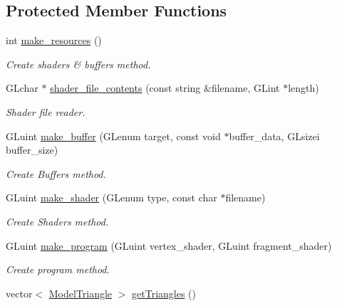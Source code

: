 \subsection*{Protected Member Functions}
\begin{DoxyCompactItemize}
\item 
int \hyperlink{classGameAsset_aa26d85233ece476d599adf90074e9568}{make\-\_\-resources} ()
\begin{DoxyCompactList}\small\item\em Create shaders \& buffers method. \end{DoxyCompactList}\item 
G\-Lchar $\ast$ \hyperlink{classGameAsset_a08c617aafc70dcba441f53260f1bb09f}{shader\-\_\-file\-\_\-contents} (const string \&filename, G\-Lint $\ast$length)
\begin{DoxyCompactList}\small\item\em Shader file reader. \end{DoxyCompactList}\item 
G\-Luint \hyperlink{classGameAsset_adfe27369433f07092b08f24b0feedfc9}{make\-\_\-buffer} (G\-Lenum target, const void $\ast$buffer\-\_\-data, G\-Lsizei buffer\-\_\-size)
\begin{DoxyCompactList}\small\item\em Create Buffers method. \end{DoxyCompactList}\item 
G\-Luint \hyperlink{classGameAsset_ac728e885b52c93c3e4976a339de54545}{make\-\_\-shader} (G\-Lenum type, const char $\ast$filename)
\begin{DoxyCompactList}\small\item\em Create Shaders method. \end{DoxyCompactList}\item 
G\-Luint \hyperlink{classGameAsset_a9d9574a21cf6b52f7a825879ca50b19d}{make\-\_\-program} (G\-Luint vertex\-\_\-shader, G\-Luint fragment\-\_\-shader)
\begin{DoxyCompactList}\small\item\em Create program method. \end{DoxyCompactList}\item 
vector$<$ \hyperlink{classModelTriangle}{Model\-Triangle} $>$ \hyperlink{classGameAsset_aad7eeea6e2a9544fd2b2fff522cca56b}{get\-Triangles} ()
\end{DoxyCompactItemize}
